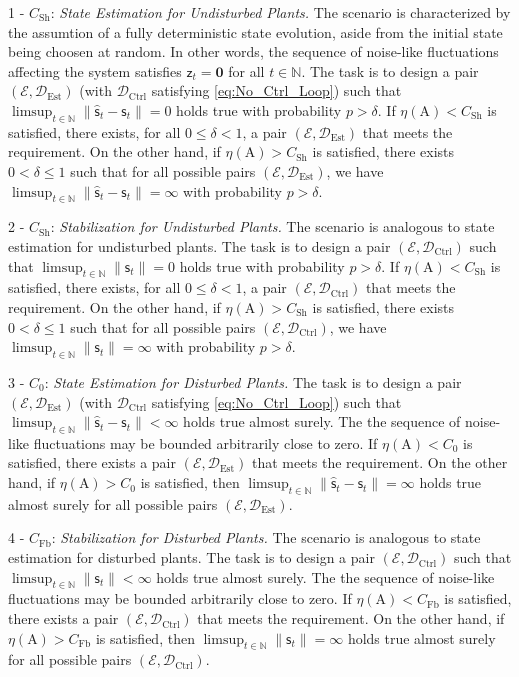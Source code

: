 \documentclass[conference]{IEEEtran}
\newcommand{\rs}{\mathsf{s}}
\newcommand{\rz}{\mathsf{z}}
\newcommand{\rsh}{\hat{\mathsf{s}}}
\def\E{{\mathcal E}}
\def\D{{\mathcal D}}
\def\NN{{\mathbb N}}
\def\mA{\bm{\mathrm{A}}}
\newcommand{\De}{\D_{\text{Est}}}
\newcommand{\Dc}{\D_{\text{Ctrl}}}
\begin{document}
	1 - \(C_{\text{Sh}}\): \emph{State Estimation for Undisturbed Plants.} The scenario is characterized by the assumtion of a fully deterministic 
	state evolution, aside from the initial state being choosen at random. In other words, the sequence of noise-like fluctuations affecting the system satisfies
	\(\rz_t = \bm{0}\) for all \(t\in\NN\). The task is to design a pair \((\E,\De)\)
	(with \(\Dc\) satisfying \eqref{eq:No_Ctrl_Loop}) such that \(\limsup_{t\in\NN} \|\rsh_t -\rs_t\| = 0\) holds true with probability \(p > \delta\).
	If \(\eta(\mA) < C_{\text{Sh}}\) is satisfied, there exists, for all \(0 \leq \delta < 1\), a pair \((\E,\De)\) that meets the requirement. On the other hand,
	if \(\eta(\mA) > C_{\text{Sh}}\) is satisfied, there exists \(0 < \delta \leq 1\) such that for all possible pairs \((\E,\De)\), we have 
	\(\limsup_{t\in\NN} \|\rsh_t -\rs_t\| = \infty\) with probability \(p > \delta\).	
		
	2 - \(C_{\text{Sh}}\): \emph{Stabilization for Undisturbed Plants.} The scenario is analogous to state estimation for undisturbed plants. 
	The task is to design a pair \((\E,\Dc)\) such that \(\limsup_{t\in\NN} \|\rs_t\| = 0\) holds true with probability \(p > \delta\).
	If \(\eta(\mA) < C_{\text{Sh}}\) is satisfied, there exists, for all \(0 \leq \delta < 1\), a pair \((\E,\Dc)\) that meets the requirement. On the other hand,
	if \(\eta(\mA) > C_{\text{Sh}}\) is satisfied, there exists \(0 < \delta \leq 1\) such that for all possible pairs \((\E,\Dc)\), we have 
	\(\limsup_{t\in\NN} \|\rs_t\| = \infty\) with probability \(p > \delta\).
	
	3 - \(C_{0}\): \emph{State Estimation for Disturbed Plants.} The task is to design a pair \((\E,\De)\)
	(with \(\Dc\) satisfying \eqref{eq:No_Ctrl_Loop}) such that \(\limsup_{t\in\NN} \|\rsh_t -\rs_t\| < \infty\) holds true almost surely.
	The the sequence of noise-like fluctuations may be bounded arbitrarily close to zero.
	If \(\eta(\mA) < C_{0}\) is satisfied, there exists a pair \((\E,\De)\) that meets the requirement. On the other hand,
	if \(\eta(\mA) > C_{0}\) is satisfied, then \(\limsup_{t\in\NN} \|\rsh_t -\rs_t\| = \infty\) holds true almost surely for all possible pairs \((\E,\De)\).
	
	4 - \(C_{\text{Fb}}\): \emph{Stabilization for Disturbed Plants.} The scenario is analogous to state estimation for disturbed plants. The task is to design a pair \((\E,\Dc)\)
	such that \(\limsup_{t\in\NN} \|\rs_t\| < \infty\) holds true almost surely. The the sequence of noise-like fluctuations may be bounded arbitrarily close to zero.
	If \(\eta(\mA) < C_{\text{Fb}}\) is satisfied, there exists a pair \((\E,\Dc)\) that meets the requirement. On the other hand,
	if \(\eta(\mA) > C_{\text{Fb}}\) is satisfied, then \(\limsup_{t\in\NN} \|\rs_t\| = \infty\) holds true almost surely for all possible pairs \((\E,\Dc)\).
	
\end{document}
